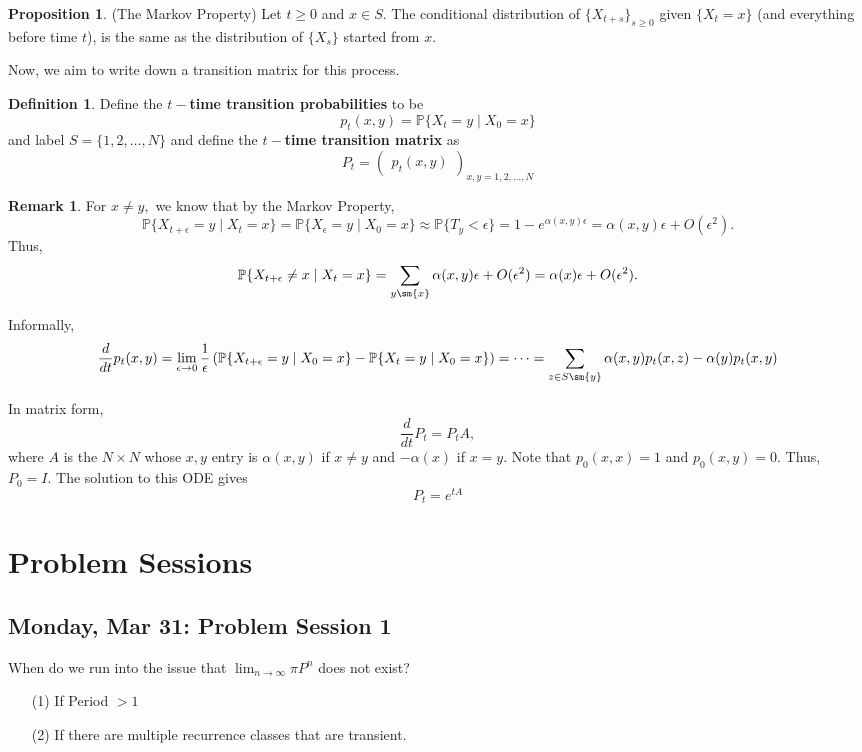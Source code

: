 \documentclass[10pt, oneside]{article}
\newcommand{\bbP}{\mathbb{P}}
\theoremstyle{definition}
\newtheorem{defn}{Definition}
\newtheorem{prop}{Proposition}
\newtheorem{rem}{Remark}
\begin{document}
\begin{prop}
(The Markov Property)
    Let $t \geq 0$ and $x\in S.$ The conditional distribution of $\{X_{t + s}\}_{s\geq 0 }$ given $\{X_t = x\}$ (and everything before time $t$), is the same as the distribution of $\{X_s\}$ started from $x.$ 
\end{prop}

Now, we aim to write down a transition matrix for this process. 
\begin{defn}
    Define the \textbf{$t-$time transition probabilities} to be 
    \[p_t(x,y) = \bbP\{X_t = y  \mid X_0 = x\}\] and label $S = \{1,2,\dots, N\}$ and define the \textbf{$t-$time transition matrix} as 
    \[P_t = \begin{pmatrix}
        p_t(x,y)
    \end{pmatrix}_{x,y = 1,2,\dots, N}\]
\end{defn}
\begin{rem}
For $x\neq y,$ we know that by the Markov Property, 
\[\bbP\{X_{t  + \epsilon} = y \mid X_t = x\} = \bbP\{X_\epsilon = y \mid X_0 = x\} \approx \bbP\{T_y < \epsilon\} = 1 - e^{\alpha(x,y)\epsilon}  = \alpha(x,y)\epsilon + O(\epsilon^2).\] Thus, 
\[\bbP\{X_{t + \epsilon} \neq x \mid X_t = x\} = \sum_{y \sm \{x\}}\alpha(x,y)\epsilon  + O(\epsilon^2) = \alpha(x)\epsilon + O(\epsilon^2).\]

Informally, \[\frac{d}{dt}p_t(x,y) = \lim_{\epsilon \to 0} \frac{1}{\epsilon}\left(\bbP\{X_{t + \epsilon }  = y \mid X_0 = x\} - \bbP\{X_t = y \mid X_0 = x\}\right) = \cdots = \sum_{z\in S\sm \{y\}}\alpha(x,y)p_t(x,z) - \alpha(y)p_t(x,y)\]

In matrix form, 
\[\frac{d}{dt}P_t = P_tA,\] where $A$ is the $N\times N$ whose $x,y$ entry is $\alpha(x,y)$ if $x\neq y$ and $-\alpha(x)$ if $x = y.$ Note that $p_0 (x,x) = 1$ and $p_0(x,y) =0.$ Thus, $P_0 = I.$ The solution to this ODE gives 
\[P_t = e^{tA}\]

\end{rem}



\newpage
\section{Problem Sessions}
\subsection{Monday, Mar 31: Problem Session 1}
When do we run into the issue that $\lim_{n\to \infty}\pi P^n$ does not exist? 
\begin{enumerate}
    \item[(1)] If Period $> 1$
    \item[(2)] If there are multiple recurrence classes that are transient.
\end{enumerate}
\end{document}
